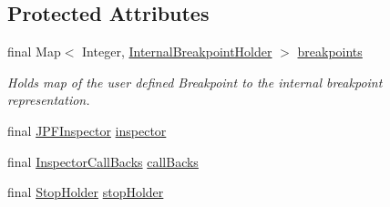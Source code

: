 \subsection*{Protected Attributes}
\begin{DoxyCompactItemize}
\item 
final Map$<$ Integer, \hyperlink{classgov_1_1nasa_1_1jpf_1_1inspector_1_1server_1_1breakpoints_1_1_internal_breakpoint_holder}{Internal\+Breakpoint\+Holder} $>$ \hyperlink{classgov_1_1nasa_1_1jpf_1_1inspector_1_1server_1_1breakpoints_1_1_break_point_handler_a034265be2e9419b28fa12d1b860295df}{breakpoints}
\begin{DoxyCompactList}\small\item\em Holds map of the user defined Breakpoint to the internal breakpoint representation. \end{DoxyCompactList}\item 
final \hyperlink{classgov_1_1nasa_1_1jpf_1_1inspector_1_1server_1_1jpf_1_1_j_p_f_inspector}{J\+P\+F\+Inspector} \hyperlink{classgov_1_1nasa_1_1jpf_1_1inspector_1_1server_1_1breakpoints_1_1_break_point_handler_a92e4bc8adfb985ae4efeef9bd96ee9e9}{inspector}
\item 
final \hyperlink{interfacegov_1_1nasa_1_1jpf_1_1inspector_1_1interfaces_1_1_inspector_call_backs}{Inspector\+Call\+Backs} \hyperlink{classgov_1_1nasa_1_1jpf_1_1inspector_1_1server_1_1breakpoints_1_1_break_point_handler_a1ee790b3c2c618b92a860b38e9171bfc}{call\+Backs}
\item 
final \hyperlink{classgov_1_1nasa_1_1jpf_1_1inspector_1_1server_1_1jpf_1_1_stop_holder}{Stop\+Holder} \hyperlink{classgov_1_1nasa_1_1jpf_1_1inspector_1_1server_1_1breakpoints_1_1_break_point_handler_ad9dd2efe1d9825c05a6c98e9d35ee459}{stop\+Holder}
\end{DoxyCompactItemize}
